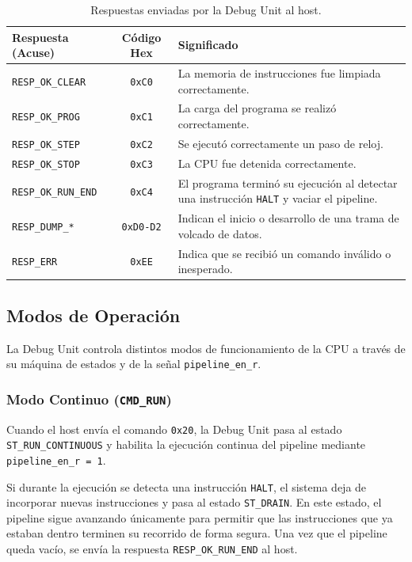 \begin{table}[h]
\centering
\begin{tabular}{|l|c|p{8.5cm}|}
\hline
\textbf{Respuesta (Acuse)} & \textbf{Código Hex} & \textbf{Significado} \\ \hline
\texttt{RESP\_OK\_CLEAR} & \texttt{0xC0} & La memoria de instrucciones fue limpiada correctamente. \\ \hline
\texttt{RESP\_OK\_PROG} & \texttt{0xC1} & La carga del programa se realizó correctamente. \\ \hline
\texttt{RESP\_OK\_STEP} & \texttt{0xC2} & Se ejecutó correctamente un paso de reloj. \\ \hline
\texttt{RESP\_OK\_STOP} & \texttt{0xC3} & La CPU fue detenida correctamente. \\ \hline
\texttt{RESP\_OK\_RUN\_END} & \texttt{0xC4} & El programa terminó su ejecución al detectar una instrucción \texttt{HALT} y vaciar el pipeline. \\ \hline
\texttt{RESP\_DUMP\_*} & \texttt{0xD0-D2} & Indican el inicio o desarrollo de una trama de volcado de datos. \\ \hline
\texttt{RESP\_ERR} & \texttt{0xEE} & Indica que se recibió un comando inválido o inesperado. \\ \hline
\end{tabular}
\caption{Respuestas enviadas por la Debug Unit al host.}
\end{table}

\subsection{Modos de Operación}
La Debug Unit controla distintos modos de funcionamiento de la CPU a través de su máquina de estados y de la señal \texttt{pipeline\_en\_r}.

\subsubsection{Modo Continuo (\texttt{CMD\_RUN})}
Cuando el host envía el comando \texttt{0x20}, la Debug Unit pasa al estado \texttt{ST\_RUN\_CONTINUOUS} y habilita la ejecución continua del pipeline mediante \texttt{pipeline\_en\_r = 1}.

Si durante la ejecución se detecta una instrucción \texttt{HALT}, el sistema deja de incorporar nuevas instrucciones y pasa al estado \texttt{ST\_DRAIN}. En este estado, el pipeline sigue avanzando únicamente para permitir que las instrucciones que ya estaban dentro terminen su recorrido de forma segura. Una vez que el pipeline queda vacío, se envía la respuesta \texttt{RESP\_OK\_RUN\_END} al host.

